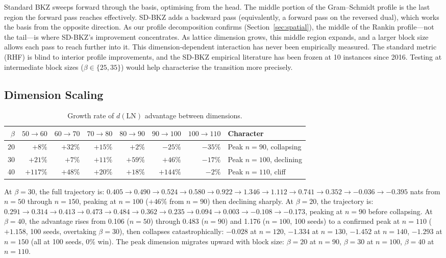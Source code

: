 \documentclass[journal=cic,version=preprint]{iacrj}
\begin{document}
Standard BKZ sweeps forward through the basis, optimising from the head. The middle portion of the Gram--Schmidt profile is the last region the forward pass reaches effectively. SD-BKZ adds a backward pass (equivalently, a forward pass on the reversed dual), which works the basis from the opposite direction. As our profile decomposition confirms (Section~\ref{sec:spatial}), the middle of the Rankin profile---not the tail---is where SD-BKZ's improvement concentrates. As lattice dimension grows, this middle region expands, and a larger block size allows each pass to reach further into it. This dimension-dependent interaction has never been empirically measured. The standard metric (RHF) is blind to interior profile improvements, and the SD-BKZ empirical literature has been frozen at 10 instances since 2016. Testing at intermediate block sizes ($\beta\in\{25, 35\}$) would help characterise the transition more precisely.

\subsection{Dimension Scaling}
\label{sec:dim-scaling}

\begin{table}[tbp]
\centering
\caption{Growth rate of $d(\mathrm{LN})$ advantage between dimensions.\label{tab:growth}}
\small
\begin{tabular}{rrrrrrrl}
\hline
$\beta$ & $50{\to}60$ & $60{\to}70$ & $70{\to}80$ & $80{\to}90$ & $90{\to}100$ & $100{\to}110$ & Character \\
\hline
20 & $+8\%$   & $+32\%$ & $+15\%$ & $+2\%$   & $-25\%$  & $-35\%$ & Peak $n{=}90$, collapsing \\
30 & $+21\%$  & $+7\%$  & $+11\%$ & $+59\%$  & $+46\%$  & $-17\%$ & Peak $n{=}100$, declining \\
40 & $+117\%$ & $+48\%$ & $+20\%$ & $+18\%$  & $+144\%$ & $-2\%$  & Peak $n{=}110$, cliff \\
\hline
\end{tabular}
\end{table}

At $\beta=30$, the full trajectory is: $0.405 \to 0.490 \to 0.524 \to 0.580 \to 0.922 \to 1.346 \to 1.112 \to 0.741 \to 0.352 \to -0.036 \to -0.395$ nats from $n=50$ through $n=150$, peaking at $n=100$ ($+46\%$ from $n=90$) then declining sharply. At $\beta=20$, the trajectory is: $0.291 \to 0.314 \to 0.413 \to 0.473 \to 0.484 \to 0.362 \to 0.235 \to 0.094 \to 0.003 \to -0.108 \to -0.173$, peaking at $n=90$ before collapsing. At $\beta=40$, the advantage rises from 0.106 ($n=50$) through 0.483 ($n=90$) and 1.176 ($n=100$, 100 seeds) to a confirmed peak at $n=110$ ($+1.158$, 100 seeds, overtaking $\beta=30$), then collapses catastrophically: $-0.028$ at $n=120$, $-1.334$ at $n=130$, $-1.452$ at $n=140$, $-1.293$ at $n=150$ (all at 100 seeds, 0\% win). The peak dimension migrates upward with block size: $\beta=20$ at $n=90$, $\beta=30$ at $n=100$, $\beta=40$ at $n=110$.
\end{document}
